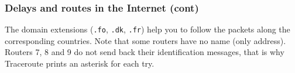 %
\begin{frame}[containsverbatim]
\frametitle{Delays and routes in the Internet (cont)}

The domain extensions (\texttt{.fo}, \texttt{.dk}, \texttt{.fr}) help
you to follow the packets along the corresponding countries. Note that
some routers have no name (only address). Routers 7, 8 and 9 do not
send back their identification messages, that is why
\textsf{Traceroute} prints an asterisk for each try.

\end{frame}
